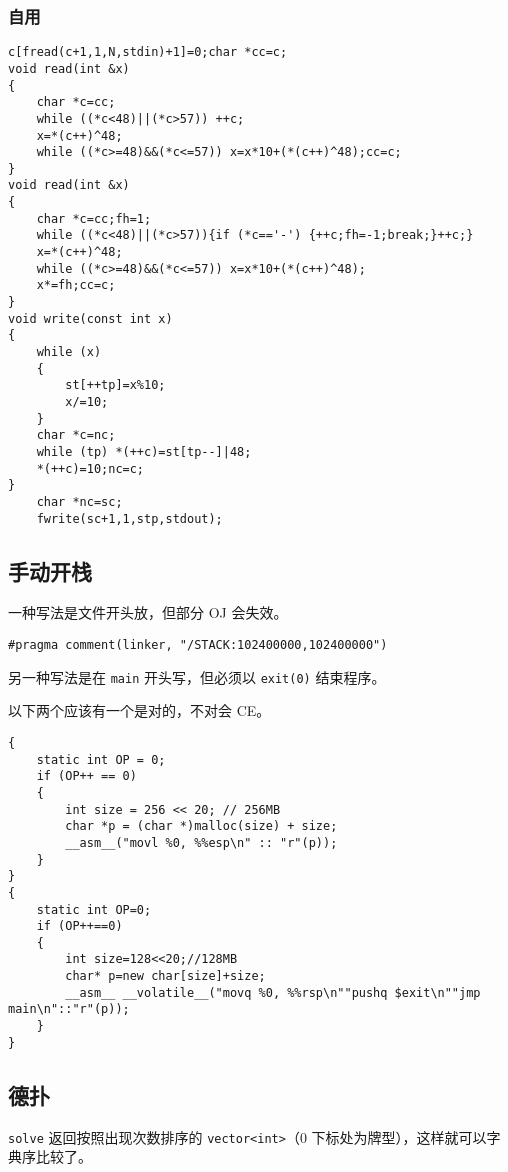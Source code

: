 \documentclass[12pt]{ctexart}
\begin{document}
\subsubsection{自用}

\begin{lstlisting}
c[fread(c+1,1,N,stdin)+1]=0;char *cc=c;
void read(int &x)
{
	char *c=cc;
	while ((*c<48)||(*c>57)) ++c;
	x=*(c++)^48;
	while ((*c>=48)&&(*c<=57)) x=x*10+(*(c++)^48);cc=c;
}
void read(int &x)
{
	char *c=cc;fh=1;
	while ((*c<48)||(*c>57)){if (*c=='-') {++c;fh=-1;break;}++c;}
	x=*(c++)^48;
	while ((*c>=48)&&(*c<=57)) x=x*10+(*(c++)^48);
	x*=fh;cc=c;
}
void write(const int x)
{
	while (x)
	{
		st[++tp]=x%10;
		x/=10;
	}
	char *c=nc;
	while (tp) *(++c)=st[tp--]|48;
	*(++c)=10;nc=c;
}
	char *nc=sc;
	fwrite(sc+1,1,stp,stdout);
\end{lstlisting}

\subsection{手动开栈}

一种写法是文件开头放，但部分 OJ 会失效。

\begin{lstlisting}
#pragma comment(linker, "/STACK:102400000,102400000")
\end{lstlisting}

另一种写法是在 \verb|main| 开头写，但必须以 \verb|exit(0)| 结束程序。

以下两个应该有一个是对的，不对会 CE。

\begin{lstlisting}
{
	static int OP = 0;
	if (OP++ == 0)
	{
		int size = 256 << 20; // 256MB
		char *p = (char *)malloc(size) + size;
		__asm__("movl %0, %%esp\n" :: "r"(p));
	}
}
{
	static int OP=0;
	if (OP++==0)
	{
		int size=128<<20;//128MB
		char* p=new char[size]+size;
		__asm__ __volatile__("movq %0, %%rsp\n""pushq $exit\n""jmp main\n"::"r"(p));
	}
}
\end{lstlisting}

\subsection{德扑}

\verb|solve| 返回按照出现次数排序的 \verb|vector<int>|（$0$ 下标处为牌型），这样就可以字典序比较了。
\end{document}
